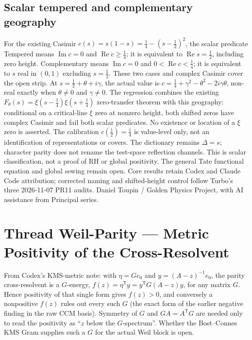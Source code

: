\documentclass{report}
\theoremstyle{definition}
\begin{document}
\subsection{Scalar tempered and complementary geography}
For the existing Casimir $c(s)=s(1-s)=\tfrac14-(s-\tfrac12)^2$, the scalar predicate Tempered means $\operatorname{Im}c=0$ and $\operatorname{Re}c\ge\tfrac14$; it is equivalent to $\operatorname{Re}s=\tfrac12$, including zero height. Complementary means $\operatorname{Im}c=0$ and $0<\operatorname{Re}c<\tfrac14$; it is equivalent to $s$ real in $(0,1)$ excluding $s=\tfrac12$. These two cases and complex Casimir cover the open strip. At $s=\tfrac12+\theta+i\gamma$, the actual value is $c=\tfrac14+\gamma^2-\theta^2-2i\gamma\theta$, non-real exactly when $\theta\ne0$ and $\gamma\ne0$.
The regression combines the existing $F_\theta(s)=\xi(s-\tfrac14)\xi(s+\tfrac14)$ zero-transfer theorem with this geography: conditional on a critical-line $\xi$ zero at nonzero height, both shifted zeros have complex Casimir and fail both scalar predicates. No existence or location of a $\xi$ zero is asserted. The calibration $c(\tfrac12)=\tfrac14$ is value-level only, not an identification of representations or covers. The dictionary remains $\Delta=s$; character parity does not rename the test-space reflection channels. This is scalar classification, not a proof of RH or global positivity. The general Tate functional equation and global sewing remain open.
Core results retain Codex and Claude Code attribution; corrected naming and shifted-height control follow Turbo's three 2026-11-07 PR11 audits. Daniel Toupin / Golden Physics Project, with AI assistance from Principal series.

\section{Thread Weil-Parity --- Metric Positivity of the Cross-Resolvent}
From Codex's KMS-metric note: with $\eta=Ge_0$ and $y=(A-z)^{-1}e_0$, the parity cross-resolvent is a $G$-energy, $f(z)=\eta^{\mathsf T}y=y^{\mathsf T}G(A-z)y$, for any matrix $G$. Hence positivity of that single form gives $f(z)>0$, and conversely a nonpositive $f(z)$ rules out every such $G$ (the exact form of the earlier negative finding in the raw CCM basis). Symmetry of $G$ and $GA=A^{\mathsf T}G$ are needed only to read the positivity as ``$z$ below the $G$-spectrum''. Whether the Bost--Connes KMS Gram supplies such a $G$ for the actual Weil block is open.
\end{document}
